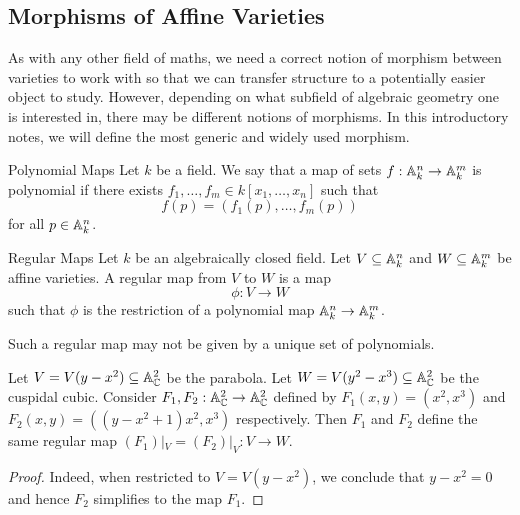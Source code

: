 \documentclass[a4paper]{article}
\begin{document}
\subsection{Morphisms of Affine Varieties}
As with any other field of maths, we need a correct notion of morphism between varieties to work with so that we can transfer structure to a potentially easier object to study. However, depending on what subfield of algebraic geometry one is interested in, there may be different notions of morphisms. In this introductory notes, we will define the most generic and widely used morphism. 

\begin{defn}{Polynomial Maps}{} Let $k$ be a field. We say that a map of sets $f:\mathbb{A}_k^n\to\mathbb{A}_k^m$ is polynomial if there exists $f_1,\dots,f_m\in k[x_1,\dots,x_n]$ such that $$f(p)=(f_1(p),\dots,f_m(p))$$ for all $p\in\mathbb{A}_k^n$. 
\end{defn}

\begin{defn}{Regular Maps}{} Let $k$ be an algebraically closed field. Let $V\subseteq\mathbb{A}_k^n$ and $W\subseteq\mathbb{A}_k^m$ be affine varieties. A regular map from $V$ to $W$ is a map $$\phi:V\to W$$ such that $\phi$ is the restriction of a polynomial map $\mathbb{A}_k^n\to\mathbb{A}_k^m$. 
\end{defn}

Such a regular map may not be given by a unique set of polynomials. 

\begin{eg}{}{} Let $V=V(y-x^2)\subseteq\mathbb{A}_{\mathbb{C}}^2$ be the parabola. Let $W=V(y^2-x^3)\subseteq\mathbb{A}_{\mathbb{C}}^2$ be the cuspidal cubic. Consider $F_1,F_2:\mathbb{A}_{\mathbb{C}}^2\to\mathbb{A}_{\mathbb{C}}^2$ defined by $F_1(x,y)=(x^2,x^3)$ and $F_2(x,y)=((y-x^2+1)x^2,x^3)$ respectively. Then $F_1$ and $F_2$ define the same regular map $(F_1)|_V=(F_2)|_V:V\to W$. \tcbline
\begin{proof}
Indeed, when restricted to $V=V(y-x^2)$, we conclude that $y-x^2=0$ and hence $F_2$ simplifies to the map $F_1$. 
\end{proof}
\end{eg}
\end{document}

